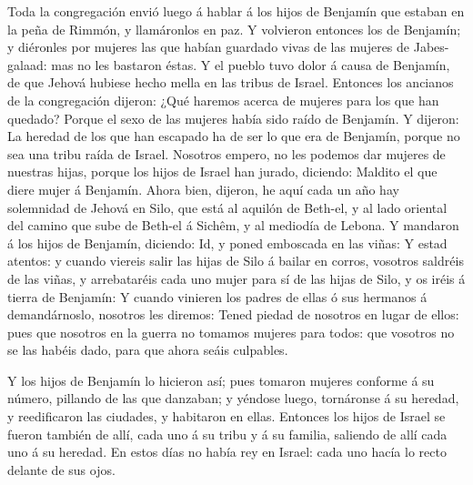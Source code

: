  Toda la congregación envió luego á hablar á los hijos de
Benjamín que estaban en la peña de Rimmón, y llamáronlos en paz.
 Y volvieron entonces los de Benjamín; y diéronles por
mujeres las que habían guardado vivas de las mujeres de Jabes-galaad:
mas no les bastaron éstas.  Y el pueblo tuvo dolor á causa
de Benjamín, de que Jehová hubiese hecho mella en las tribus de Israel.
 Entonces los ancianos de la congregación dijeron: ¿Qué
haremos acerca de mujeres para los que han quedado? Porque el sexo de
las mujeres había sido raído de Benjamín.  Y dijeron: La
heredad de los que han escapado ha de ser lo que era de Benjamín, porque
no sea una tribu raída de Israel.  Nosotros empero, no les
podemos dar mujeres de nuestras hijas, porque los hijos de Israel han
jurado, diciendo: Maldito el que diere mujer á Benjamín. 
Ahora bien, dijeron, he aquí cada un año hay solemnidad de Jehová en
Silo, que está al aquilón de Beth-el, y al lado oriental del camino que
sube de Beth-el á Sichêm, y al mediodía de Lebona.  Y
mandaron á los hijos de Benjamín, diciendo: Id, y poned emboscada en las
viñas:  Y estad atentos: y cuando viereis salir las hijas
de Silo á bailar en corros, vosotros saldréis de las viñas, y
arrebataréis cada uno mujer para sí de las hijas de Silo, y os iréis á
tierra de Benjamín:  Y cuando vinieren los padres de ellas
ó sus hermanos á demandárnoslo, nosotros les diremos: Tened piedad de
nosotros en lugar de ellos: pues que nosotros en la guerra no tomamos
mujeres para todos: que vosotros no se las habéis dado, para que ahora
seáis culpables.

 Y los hijos de Benjamín lo hicieron así; pues tomaron
mujeres conforme á su número, pillando de las que danzaban; y yéndose
luego, tornáronse á su heredad, y reedificaron las ciudades, y habitaron
en ellas.  Entonces los hijos de Israel se fueron también
de allí, cada uno á su tribu y á su familia, saliendo de allí cada uno á
su heredad.  En estos días no había rey en Israel: cada uno
hacía lo recto delante de sus ojos.
